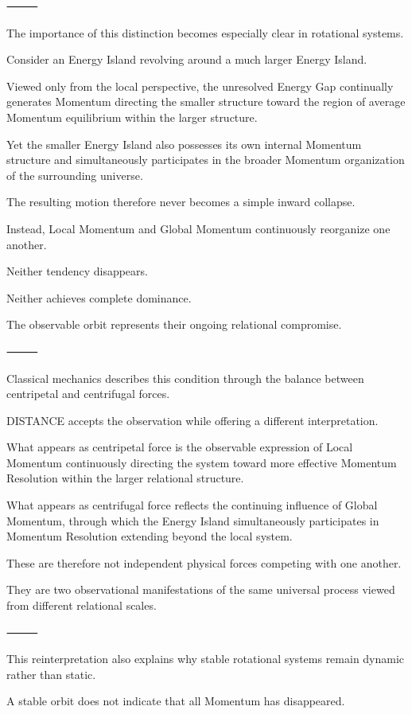 ⸻

The importance of this distinction becomes especially clear in rotational systems.

Consider an Energy Island revolving around a much larger Energy Island.

Viewed only from the local perspective, the unresolved Energy Gap continually generates Momentum directing the smaller structure toward the region of average Momentum equilibrium within the larger structure.

Yet the smaller Energy Island also possesses its own internal Momentum structure and simultaneously participates in the broader Momentum organization of the surrounding universe.

The resulting motion therefore never becomes a simple inward collapse.

Instead, Local Momentum and Global Momentum continuously reorganize one another.

Neither tendency disappears.

Neither achieves complete dominance.

The observable orbit represents their ongoing relational compromise.

⸻

Classical mechanics describes this condition through the balance between centripetal and centrifugal forces.

DISTANCE accepts the observation while offering a different interpretation.

What appears as centripetal force is the observable expression of Local Momentum continuously directing the system toward more effective Momentum Resolution within the larger relational structure.

What appears as centrifugal force reflects the continuing influence of Global Momentum, through which the Energy Island simultaneously participates in Momentum Resolution extending beyond the local system.

These are therefore not independent physical forces competing with one another.

They are two observational manifestations of the same universal process viewed from different relational scales.

⸻

This reinterpretation also explains why stable rotational systems remain dynamic rather than static.

A stable orbit does not indicate that all Momentum has disappeared.

